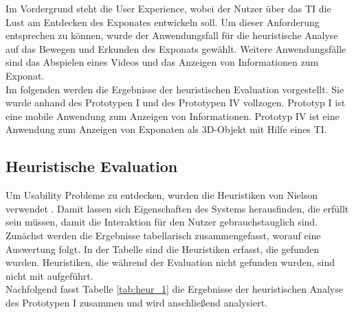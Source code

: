 \documentclass[runningheads,a4paper, 12pt]{llncs}
\begin{document}
Im Vordergrund steht die User Experience, wobei der Nutzer über das TI die Lust am Entdecken des Exponates entwickeln soll. Um dieser Anforderung entsprechen zu können, wurde der Anwendungsfall für die heuristische Analyse auf das Bewegen und Erkunden des Exponats gewählt. Weitere Anwendungsfälle sind das Abspielen eines Videos und das Anzeigen von Informationen zum Exponat.\\

Im folgenden werden die Ergebnisse der heuristischen Evaluation vorgestellt. Sie wurde anhand des Prototypen I und des Prototypen IV vollzogen. Prototyp I ist eine mobile Anwendung zum Anzeigen von Informationen. Prototyp IV ist eine Anwendung zum Anzeigen von Exponaten als 3D-Objekt mit Hilfe eines TI.\\

\subsection{Heuristische Evaluation}
Um Usability Probleme zu entdecken, wurden die Heuristiken von Nielson verwendet \cite{Nielsen.1994}. Damit lassen sich Eigenschaften des Systems herausfinden, die erfüllt sein müssen, damit die Interaktion für den Nutzer gebrauchstauglich sind. Zunächst werden die Ergebnisse tabellarisch zusammengefasst, worauf eine Auswertung folgt. In der Tabelle sind die Heuristiken erfasst, die gefunden wurden. Heuristiken, die während der Evaluation nicht gefunden wurden, sind nicht mit aufgeführt.\\

Nachfolgend fasst Tabelle \ref{tab:heur_1} die Ergebnisse der heuristischen Analyse des Prototypen I zusammen und wird anschließend analysiert. 
\end{document}
